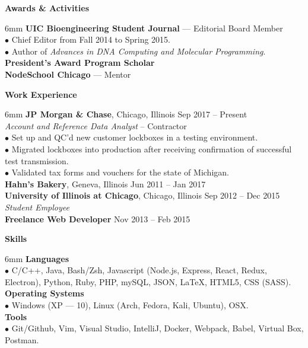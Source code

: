 \documentclass[11pt]{article}
\newcommand{\sectionheader}[1]{\noindent \textbf{\large #1}}
\newenvironment{sectionbody}{\begin{adjustwidth}{6mm}{}}{\end{adjustwidth}}
\begin{document}
\vspace{2mm}

\sectionheader{Awards \& Activities}
\begin{sectionbody}
{\bf UIC Bioengineering Student Journal} --- Editorial Board Member \\
$\bullet$ Chief Editor from Fall 2014 to Spring 2015. \\
$\bullet$ Author of {\it Advances in DNA Computing and Molecular Programming}. \\
{\bf President's Award Program Scholar} \\
{\bf NodeSchool Chicago} --- Mentor
\end{sectionbody}

\vspace{2mm}

\sectionheader{Work Experience}
\begin{sectionbody}
{\bf JP Morgan \& Chase}, Chicago, Illinois \hfill Sep 2017 -- Present \\
    \textit{Account and Reference Data Analyst} -- Contractor \\
$\bullet$ Set up and QC'd new customer lockboxes in a testing environment. \\
$\bullet$ Migrated lockboxes into production after receiving confirmation of successful test transmission. \\
$\bullet$ Validated tax forms and vouchers for the state of Michigan. \\
{\bf Hahn's Bakery}, Geneva, Illinois \hfill Jun 2011 -- Jan 2017 \\
{\bf University of Illinois at Chicago}, Chicago, Illinois \hfill Sep 2012 -- Dec 2015 \\
\textit{Student Employee} \\
{\bf Freelance Web Developer} \hfill Nov 2013 -- Feb 2015
\end{sectionbody}

\vspace{2mm}

\sectionheader{Skills}
\begin{sectionbody}
{\bf Languages} \\
$\bullet$ C/C++, Java, Bash/Zsh, Javascript (Node.js, Express, React, Redux, Electron), Python, Ruby, PHP, mySQL, JSON, \LaTeX, HTML5, CSS (SASS). \\
{\bf Operating Systems} \\
$\bullet$ Windows (XP --- 10), Linux (Arch, Fedora, Kali, Ubuntu), OSX. \\
{\bf Tools} \\
$\bullet$ Git/Github, Vim, Visual Studio, IntelliJ, Docker, Webpack, Babel, Virtual Box, Postman.
\end{sectionbody}
\end{document}
